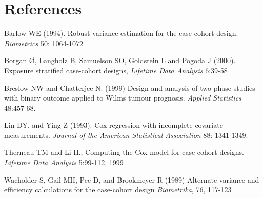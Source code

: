 \documentclass{article}
\begin{document}
\section*{References}

Barlow WE (1994). Robust variance estimation for the case-cohort
design. \emph{Biometrics} 50: 1064-1072

Borgan \O, Langholz B, Samuelson SO, Goldstein L and Pogoda J (2000). Exposure stratified case-cohort designs,  \emph{Lifetime Data Analysis}  6:39-58

Breslow NW and Chatterjee N. (1999) Design and analysis of two-phase
studies with binary outcome applied to Wilms tumour prognosis.  \emph{Applied
Statistics}  48:457-68.


Lin DY, and Ying Z (1993). Cox regression with incomplete covariate measurements.
\emph{Journal of the American Statistical Association} 88: 1341-1349.

Therneau TM and Li H., Computing the Cox model for case-cohort
designs. \emph{Lifetime Data Analysis} 5:99-112, 1999

Wacholder S, Gail MH, Pee D, and Brookmeyer R (1989)
Alternate variance and efficiency calculations for the case-cohort design
\emph{Biometrika}, 76, 117-123 
\end{document}
